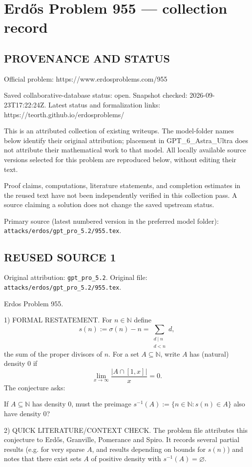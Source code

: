 \section*{Erd\H{o}s Problem 955 --- collection record}

\subsection*{PROVENANCE AND STATUS}
Official problem: https://www.erdosproblems.com/955

Saved collaborative-database status: open.
Snapshot checked: 2026-09-23T17:22:24Z.
Latest status and formalization links: https://teorth.github.io/erdosproblems/

This is an attributed collection of existing writeups. The model-folder names below identify their original attribution; placement in GPT\_6\_Astra\_Ultra does not attribute their mathematical work to that model. All locally available source versions selected for this problem are reproduced below, without editing their text.

Proof claims, computations, literature statements, and completion estimates in the reused text have not been independently verified in this collection pass. A source claiming a solution does not change the saved upstream status.

Primary source (latest numbered version in the preferred model folder): \texttt{attacks/erdos/gpt\_pro\_5.2/955.tex}.

\subsection*{REUSED SOURCE 1}
Original attribution: \texttt{gpt\_pro\_5.2}.
Original file: \texttt{attacks/erdos/gpt\_pro\_5.2/955.tex}.


Erdos Problem 955.

1) FORMAL RESTATEMENT.
For $n\in\mathbb{N}$ define
\[
 s(n):=\sigma(n)-n=\sum_{\substack{d\mid n\\ d<n}} d,
\]
the sum of the proper divisors of $n$.
For a set $A\subseteq\mathbb{N}$, write $A$ has (natural) density $0$ if
\[
\lim_{x\to\infty} \frac{|A\cap [1,x]|}{x}=0.
\]
The conjecture asks:

If $A\subseteq\mathbb{N}$ has density $0$, must the preimage
$s^{-1}(A):=\{n\in\mathbb{N}: s(n)\in A\}$ also have density $0$?

2) QUICK LITERATURE/CONTEXT CHECK.
The problem file attributes this conjecture to Erd\H{o}s, Granville, Pomerance and Spiro.
It records several partial results (e.g. for very sparse $A$, and results depending on bounds for $s(n)$) and notes that there exist sets $A$ of positive density with $s^{-1}(A)=\varnothing$.


